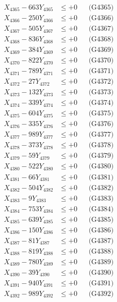 \documentclass[a4paper,10pt]{article}
\begin{document}
{\begin{align}
X_{4365} - 663Y_{4365} &\leq +0 && \text{(G4365)} \\
X_{4366} - 250Y_{4366} &\leq +0 && \text{(G4366)} \\
X_{4367} - 505Y_{4367} &\leq +0 && \text{(G4367)} \\
X_{4368} - 836Y_{4368} &\leq +0 && \text{(G4368)} \\
X_{4369} - 384Y_{4369} &\leq +0 && \text{(G4369)} \\
X_{4370} - 822Y_{4370} &\leq +0 && \text{(G4370)} \\
\allowbreak
X_{4371} - 789Y_{4371} &\leq +0 && \text{(G4371)} \\
X_{4372} - 27Y_{4372} &\leq +0 && \text{(G4372)} \\
X_{4373} - 132Y_{4373} &\leq +0 && \text{(G4373)} \\
X_{4374} - 339Y_{4374} &\leq +0 && \text{(G4374)} \\
X_{4375} - 604Y_{4375} &\leq +0 && \text{(G4375)} \\
X_{4376} - 335Y_{4376} &\leq +0 && \text{(G4376)} \\
X_{4377} - 989Y_{4377} &\leq +0 && \text{(G4377)} \\
X_{4378} - 373Y_{4378} &\leq +0 && \text{(G4378)} \\
X_{4379} - 59Y_{4379} &\leq +0 && \text{(G4379)} \\
X_{4380} - 522Y_{4380} &\leq +0 && \text{(G4380)} \\
\allowbreak
X_{4381} - 66Y_{4381} &\leq +0 && \text{(G4381)} \\
X_{4382} - 504Y_{4382} &\leq +0 && \text{(G4382)} \\
X_{4383} - 9Y_{4383} &\leq +0 && \text{(G4383)} \\
X_{4384} - 753Y_{4384} &\leq +0 && \text{(G4384)} \\
X_{4385} - 639Y_{4385} &\leq +0 && \text{(G4385)} \\
X_{4386} - 150Y_{4386} &\leq +0 && \text{(G4386)} \\
X_{4387} - 81Y_{4387} &\leq +0 && \text{(G4387)} \\
X_{4388} - 819Y_{4388} &\leq +0 && \text{(G4388)} \\
X_{4389} - 780Y_{4389} &\leq +0 && \text{(G4389)} \\
X_{4390} - 39Y_{4390} &\leq +0 && \text{(G4390)} \\
\allowbreak
X_{4391} - 940Y_{4391} &\leq +0 && \text{(G4391)} \\
X_{4392} - 989Y_{4392} &\leq +0 && \text{(G4392)} \\

\end{align}}
\end{document}
